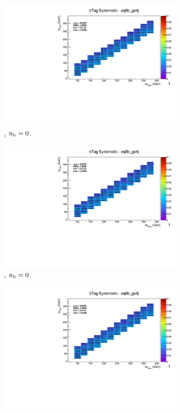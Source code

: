 \begin{figure}[ht!]
\begin{subfigure}[b]{0.32\textwidth}
    \includegraphics[width=\textwidth, page=12]{Figs/sms/t2degen/v19/systs_v2/T2_4body_bTag_eq0b_ge4j.pdf}
    \caption{\njhigh, $n_{\text{b}} = 0$.}
  \end{subfigure}
  \begin{subfigure}[b]{0.32\textwidth}
    \includegraphics[width=\textwidth, page=8]{Figs/sms/t2degen/v19/systs_v2/T2_4body_bTag_eq0b_ge4j.pdf}
    \caption{\njhigh, $n_{\text{b}} = 0$.}
  \end{subfigure}
  \begin{subfigure}[b]{0.32\textwidth}
    \includegraphics[width=\textwidth, page=1]{Figs/sms/t2degen/v19/systs_v2/T2_4body_bTag_eq0b_ge4j.pdf}

\end{subfigure}
\end{figure}
